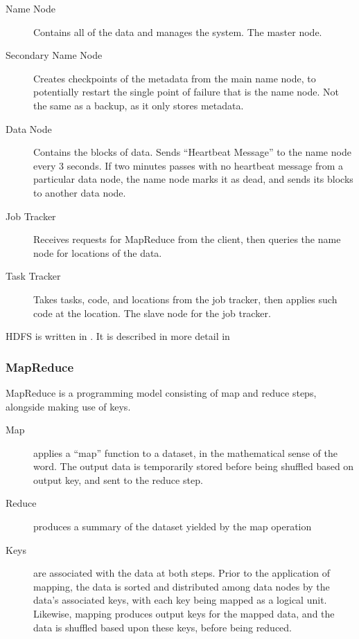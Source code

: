 \begin{description}

	\item[Name Node]
		Contains all of the data and manages the system.
		The master node.
	\item[Secondary Name Node]
		Creates checkpoints of the metadata from the main name node, to
		potentially restart the single point of failure that is the name node.
		Not the same as a backup, as it only stores metadata.
	\item[Data Node]
		Contains the blocks of data.
		Sends ``Heartbeat Message'' to the name node every 3 seconds.
		If two minutes passes with no heartbeat message from a particular data node, the name node marks it as dead, and sends its blocks to another data node.
	\item[Job Tracker]
		Receives requests for MapReduce from the client, then queries the name
		node for locations of the data.
	\item[Task Tracker]
		Takes tasks, code, and locations from the job tracker, then applies such
		code at the location.
		The slave node for the job tracker.
\end{description}

HDFS is written in .
It is described in more detail in \cite{shvachko2010hadoop}

\subsubsection{MapReduce}\label{sec:mapreduce}

MapReduce is a programming model consisting of map and reduce steps, alongside making use of keys.

\begin{description}

	\item[Map]
		applies a ``map'' function to a dataset, in the mathematical sense of
		the word.
		The output data is temporarily stored before being shuffled based on output key, and sent to the reduce step.
	\item[Reduce]
		produces a summary of the dataset yielded by the map operation
	\item[Keys]
		are associated with the data at both steps.
		Prior to the application of mapping, the data is sorted and distributed among data nodes by the data's associated keys, with each key being mapped as a logical unit.
		Likewise, mapping produces output keys for the mapped data, and the data is shuffled based upon these keys, before being reduced.
\end{description}

